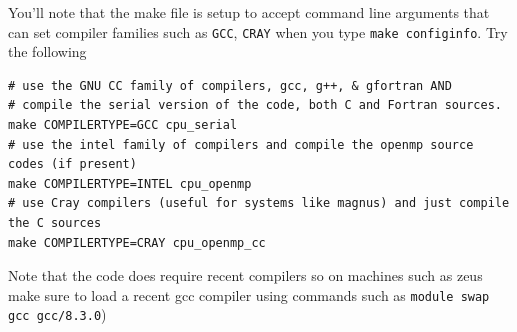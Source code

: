 You'll note that the make file is setup to accept command line arguments that can set compiler families such as \texttt{GCC}, \texttt{CRAY} when you type \texttt{make configinfo}. Try the following
\begin{center}
\begin{minipage}{0.95\textwidth}
\small
\begin{verbatim}
# use the GNU CC family of compilers, gcc, g++, & gfortran AND 
# compile the serial version of the code, both C and Fortran sources.
make COMPILERTYPE=GCC cpu_serial 
# use the intel family of compilers and compile the openmp source codes (if present)
make COMPILERTYPE=INTEL cpu_openmp 
# use Cray compilers (useful for systems like magnus) and just compile the C sources 
make COMPILERTYPE=CRAY cpu_openmp_cc 
\end{verbatim}
\end{minipage}
\end{center}
Note that the code does require recent compilers so on machines such as zeus make sure to load a recent gcc compiler using commands such as \texttt{module swap gcc gcc/8.3.0})



